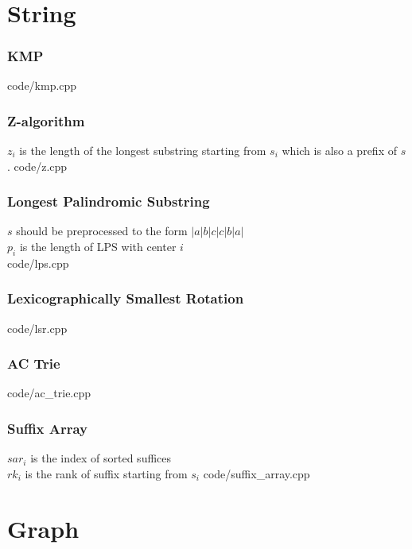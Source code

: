 \documentclass [landscape,8pt,a4paper,twocolumn]{article}
\begin{document}
\newpage
~\newline
\newpage
\part{String}

\section{KMP}
 {code/kmp.cpp}

\section{Z-algorithm}
$ z_i $ is the length of the longest substring starting from $ s_i $ which is also a prefix of $ s $.
 {code/z.cpp}

\section{Longest Palindromic Substring}
$ s $ should be preprocessed to the form $ |a|b|c|c|b|a| $\\
$ p_i $ is the length of  LPS with center $ i $\\
 {code/lps.cpp}

\section{Lexicographically Smallest Rotation}
 {code/lsr.cpp}

\vfill\null

\section{AC Trie}
 {code/ac_trie.cpp}

\vfill\null

\section{Suffix Array}
$ sar_i $ is the index of sorted suffices \\
$ rk_i $ is the rank of suffix starting from $ s_i $
 {code/suffix_array.cpp}

\newpage
\part{Graph}
\end{document}
